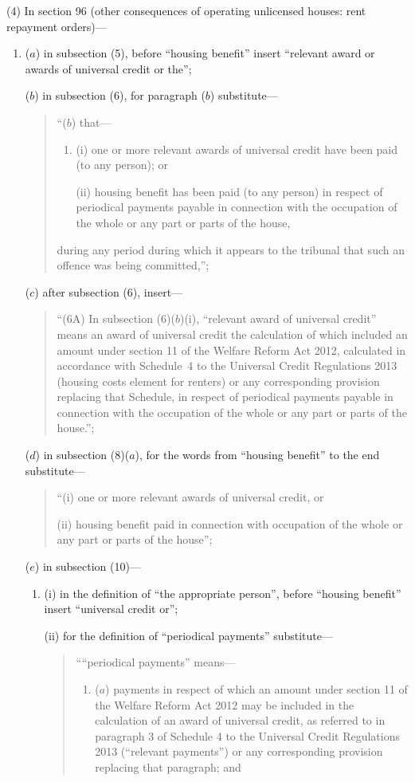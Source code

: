 \documentclass[12pt,a4paper]{article}
\begin{document}
(4) In section 96 (other consequences of operating unlicensed houses: rent repayment orders)—
\begin{enumerate}\item[]
($a$) in subsection (5), before “housing benefit” insert “relevant award or awards of universal credit or the”;

($b$) in subsection (6), for paragraph ($b$)  substitute—
\begin{quotation}
“($b$) that—
\begin{enumerate}\item[]
(i) one or more relevant awards of universal credit have been paid (to any person); or

(ii) housing benefit has been paid (to any person) in respect of periodical payments payable in connection with the occupation of the whole or any part or parts of the house,
\end{enumerate}
during any period during which it appears to the tribunal that such an offence was being committed,”;
\end{quotation}

($c$) after subsection (6), insert—
\begin{quotation}
“(6A) In subsection (6)($b$)(i), “relevant award of universal credit” means an award of universal credit the calculation of which included an amount under section 11 of the Welfare Reform Act 2012, calculated in accordance with Schedule~4 to the Universal Credit Regulations 2013 (housing costs element for renters) or any corresponding provision replacing that Schedule, in respect of periodical payments payable in connection with the occupation of the whole or any part or parts of the house.”;
\end{quotation}

($d$) in subsection (8)($a$), for the words from “housing benefit” to the end substitute—
\begin{quotation}
“(i) one or more relevant awards of universal credit, or

(ii) housing benefit paid in connection with occupation of the whole or any part or parts of the house”;
\end{quotation}

($e$) in subsection (10)—
\begin{enumerate}\item[]
(i) in the definition of “the appropriate person”, before “housing benefit” insert “universal credit or”;

(ii) for the definition of “periodical payments” substitute—
\begin{quotation}
““periodical payments” means—
\begin{enumerate}\item[]
($a$) 
payments in respect of which an amount under section 11 of the Welfare Reform Act 2012 may be included in the calculation of an award of universal credit, as referred to in paragraph 3 of Schedule 4 to the Universal Credit Regulations 2013 (“relevant payments”) or any corresponding provision replacing that paragraph; and


\end{enumerate}
\end{quotation}
\end{enumerate}
\end{enumerate}
\end{document}
